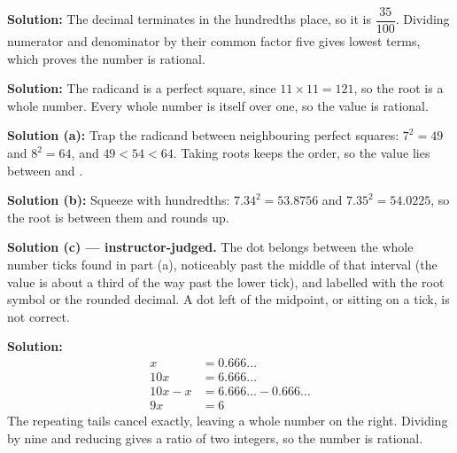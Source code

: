 \documentclass[12pt]{article}
\begin{document}




\textbf{Solution:} \quad The decimal terminates in the hundredths place, so it is
$\dfrac{35}{100}$. Dividing numerator and denominator by their common factor five gives
lowest terms, which proves the number is rational. 


\textbf{Solution:} \quad The radicand is a perfect square, since $11 \times 11 = 121$, so
the root is a whole number. Every whole number is itself over one, so the value is
rational. 


\textbf{Solution (a):} \quad Trap the radicand between neighbouring perfect squares:
$7^2 = 49$ and $8^2 = 64$, and $49 < 54 < 64$. Taking roots keeps the order, so the value
lies between  and .

\textbf{Solution (b):} \quad Squeeze with hundredths: $7.34^2 = 53.8756$ and
$7.35^2 = 54.0225$, so the root is between them and rounds up. 

\textbf{Solution (c) --- instructor-judged.} \quad The dot belongs between the whole
number ticks found in part (a), noticeably past the middle of that interval (the value is
about a third of the way past the lower tick), and labelled with the root symbol or the
rounded decimal. A dot left of the midpoint, or sitting on a tick, is not correct.


\textbf{Solution:}
\begin{align*}
  x &= 0.666\ldots \\
  10x &= 6.666\ldots \\
  10x - x &= 6.666\ldots - 0.666\ldots \\
  9x &= 6
\end{align*}
The repeating tails cancel exactly, leaving a whole number on the right. Dividing by nine
and reducing gives a ratio of two integers, so the number is rational. 
\end{document}
